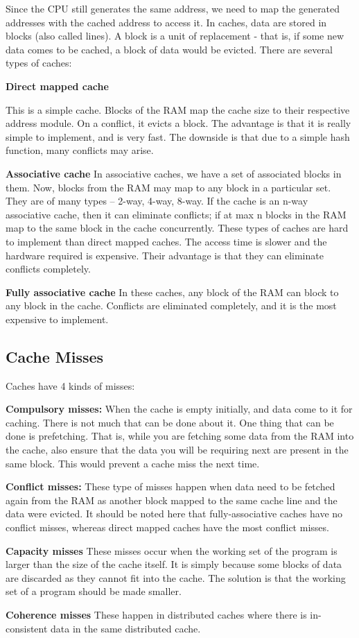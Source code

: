 \documentclass[../notes.tex]{subfiles}
\begin{document}
Since the CPU still generates the same address, we need to map the generated addresses with the cached address to access it. In caches, data are stored in blocks (also called lines). A block is a unit of replacement - that is, if some new data comes to be cached, a block of data would be evicted. There are several types of caches:

\textbf{Direct mapped cache}

This is a simple cache. Blocks of the RAM map the cache size to their respective address module. On a conflict, it evicts a block. The advantage is that it is really simple to implement, and is very fast. The downside is that due to a simple hash function, many conflicts may arise.

\textbf{Associative cache}
In associative caches, we have a set of associated blocks in them. Now, blocks from the RAM may map to any block in a particular set. They are of many types – 2-way, 4-way, 8-way. If the cache is an n-way associative cache, then it can eliminate conflicts; if at max n blocks in the RAM map to the same block in the cache concurrently. These types of caches are hard to implement than direct mapped caches. The access time is slower and the hardware required is expensive. Their advantage is that they can eliminate conflicts completely.

\textbf{Fully associative cache}
In these caches, any block of the RAM can block to any block in the cache. Conflicts are eliminated completely, and it is the most expensive to implement.

\subsection{Cache Misses}
Caches have 4 kinds of misses:

\textbf{Compulsory misses:}
When the cache is empty initially, and data come to it for caching. There is not much that can be done about it. One thing that can be done is prefetching. That is, while you are fetching some data from the RAM into the cache, also ensure that the data you will be requiring next are present in the same block. This would prevent a cache miss the next time.

\textbf{Conflict misses:}
These type of misses happen when data need to be fetched again from the RAM as another block mapped to the same cache line and the data were evicted. It should be noted here that fully-associative caches have no conflict misses, whereas direct mapped caches have the most conflict misses.

\textbf{Capacity misses}
These misses occur when the working set of the program is larger than the size of the cache itself. It is simply because some blocks of data are discarded as they cannot fit into the cache. The solution is that the working set of a program should be made smaller.

\textbf{Coherence misses}
These happen in distributed caches where there is in-consistent data in the same distributed cache.
\end{document}
